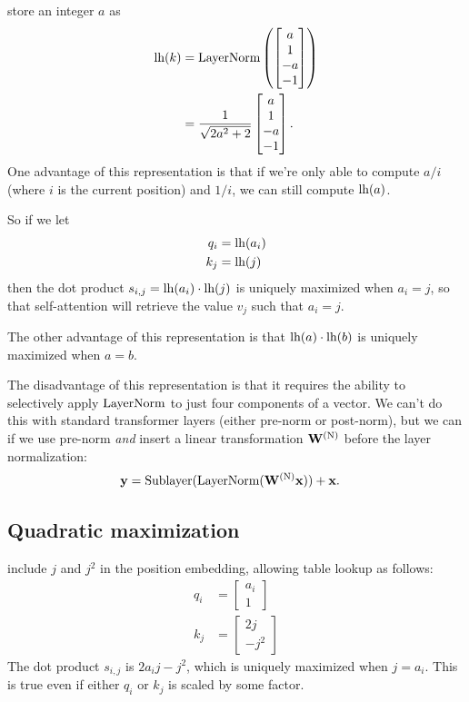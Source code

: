  store an integer $a$ as
\begin{align*}
  \textnormal{lh}(k) &= \textnormal{LayerNorm}\left(\begin{bmatrix} a \\ 1 \\ -a \\ -1 \end{bmatrix}\right) \\
  &= \frac1{\sqrt{2a^2+2}} \begin{bmatrix} a \\ 1 \\ -a \\ -1 \end{bmatrix}.
\end{align*}
One advantage of this representation is that if we're only able to compute $a/i$ (where $i$ is the current position) and $1/i$, we can still compute $\textnormal{lh}(a)$.

So if we let
\begin{align*}
  q_i &= \textnormal{lh}(a_i) \\
  k_j &= \textnormal{lh}(j)
\end{align*}
then the dot product $s_{i,j} = \textnormal{lh}(a_i) \cdot \textnormal{lh}(j)$ is uniquely maximized when $a_i = j$, so that self-attention will retrieve the value $v_j$ such that $a_i = j$.

The other advantage of this representation is that $\textnormal{lh}(a) \cdot \textnormal{lh}(b)$ is uniquely maximized when $a=b$. 

The disadvantage of this representation is that it requires the ability to selectively apply $\textnormal{LayerNorm}$ to just four components of a vector. We can't do this with standard transformer layers (either pre-norm or post-norm), but we can if we use pre-norm \emph{and} insert a linear transformation $\mathbf{W}^{(\textnormal{N})}$ before the layer normalization:
\begin{align*}
  \mathbf{y} &= \textnormal{Sublayer}(\textnormal{LayerNorm}(\mathbf{W}^{(\textnormal{N})} \mathbf{x})) + \mathbf{x}.
\end{align*}

\subsection{Quadratic maximization}

 include $j$ and $j^2$ in the position embedding, allowing table lookup as follows:
\begin{align*}
  q_i &= \begin{bmatrix} a_i \\ 1 \end{bmatrix} \\
  k_j &= \begin{bmatrix} 2j \\ -j^2 \end{bmatrix}
\end{align*}
The dot product $s_{i,j}$ is $2a_ij - j^2$, which is uniquely maximized when $j=a_i$.
This is true even if either $q_i$ or $k_j$ is scaled by some factor.

